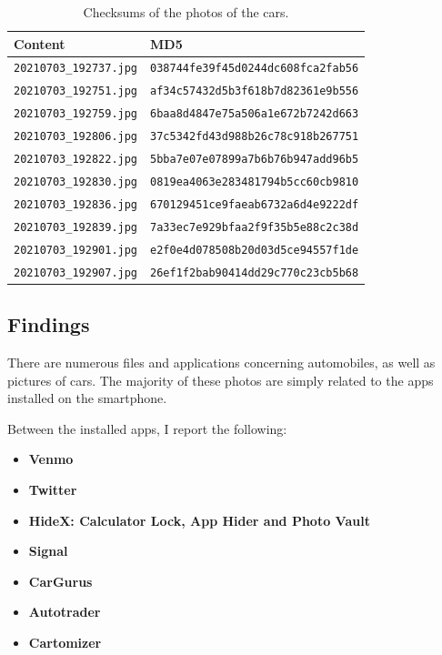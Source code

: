 \documentclass[12pt]{article}
\begin{document}
\begin{table}[!ht]
    \centering
    \begin{tabular}{ll}
    \toprule
    \textbf{Content} & \textbf{MD5} \\
    \midrule
    \texttt{20210703\_192737.jpg} & \texttt{038744fe39f45d0244dc608fca2fab56} \\
    \texttt{20210703\_192751.jpg} & \texttt{af34c57432d5b3f618b7d82361e9b556} \\
    \texttt{20210703\_192759.jpg} & \texttt{6baa8d4847e75a506a1e672b7242d663} \\
    \texttt{20210703\_192806.jpg} & \texttt{37c5342fd43d988b26c78c918b267751} \\
    \texttt{20210703\_192822.jpg} & \texttt{5bba7e07e07899a7b6b76b947add96b5} \\
    \texttt{20210703\_192830.jpg} & \texttt{0819ea4063e283481794b5cc60cb9810} \\
    \texttt{20210703\_192836.jpg} & \texttt{670129451ce9faeab6732a6d4e9222df} \\
    \texttt{20210703\_192839.jpg} & \texttt{7a33ec7e929bfaa2f9f35b5e88c2c38d} \\
    \texttt{20210703\_192901.jpg} & \texttt{e2f0e4d078508b20d03d5ce94557f1de} \\
    \texttt{20210703\_192907.jpg} & \texttt{26ef1f2bab90414dd29c770c23cb5b68} \\
    \bottomrule
    \end{tabular}
    \caption{Checksums of the photos of the cars.}
    \label{table:hashes-cars}
\end{table}


\subsection{Findings}

There are numerous files and applications concerning automobiles, as well as pictures of cars. The majority of these photos are simply related to the apps installed on the smartphone.

Between the installed apps, I report the following:
\begin{itemize}
    \item \textbf{Venmo} \cite{venmo}
    \item \textbf{Twitter}
    \item \textbf{HideX: Calculator Lock, App Hider and Photo Vault} \cite{calculator} 
    \item \textbf{Signal} \cite{signal} 
    \item \textbf{CarGurus}
    \item \textbf{Autotrader}
    \item \textbf{Cartomizer}
\end{itemize}
\end{document}
